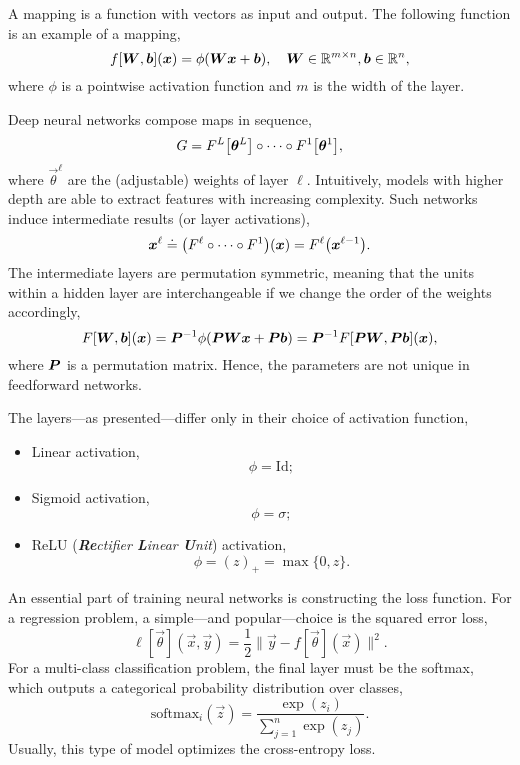 A mapping is a function with vectors as input and output. The following function is an example of a
mapping, \[
    f[\bm{W}, \bm{b}](\bm{x}) = \phi(\bm{W} \bm{x} + \bm{b}), \quad \bm{W} \in \mathbb{R}^{m \times n}, \bm{b} \in \mathbb{R}^n,
\]
where $\phi$ is a pointwise activation function and $m$ is the width of the layer.

Deep neural networks compose maps in sequence, \[
    G = F^L\lft[ \vec{\theta}^L \rgt] \circ \cdots \circ F^1 \lft[ \vec{\theta}^1 \rgt],
\]
where $\vec{\theta}^{\ell}$ are the (adjustable) weights of layer $\ell$. Intuitively, models with
higher depth are able to extract features with increasing complexity. Such networks induce
intermediate results (or layer activations), \[
    \vec{x}^{\ell} \doteq \lft( F^{\ell} \circ \cdots \circ F^{1} \rgt)(\vec{x}) = F^{\ell}\lft( \vec{x}^{\ell-1} \rgt).
\]
The intermediate layers are permutation symmetric, meaning that the units within a hidden layer are
interchangeable if we change the order of the weights accordingly, \[
    F[\bm{W}, \bm{b}](\bm{x}) = \bm{P}^{-1} \phi(\bm{P}\bm{W}\bm{x} + \bm{P}\bm{b}) = \bm{P}^{-1} F[\bm{P}\bm{W},\bm{P}\bm{b}](\bm{x}),
\]
where $\bm{P}$ is a permutation matrix. Hence, the parameters are not unique in feedforward networks.

The layers---as presented---differ only in their choice of activation function,
\begin{itemize}
    \item Linear activation, \[
              \phi = \mathrm{Id};
          \]
    \item Sigmoid activation, \[
              \phi = \sigma;
          \]
    \item ReLU (\textit{\textbf{Re}ctifier \textbf{L}inear \textbf{U}nit}) activation, \[
              \phi = (z)_+ = \max \{ 0, z \}.
          \]
\end{itemize}

An essential part of training neural networks is constructing the loss function. For a regression
problem, a simple---and popular---choice is the squared error loss, \[
    \ell[\vec{\theta}](\vec{x}, \vec{y}) = \frac{1}{2} \| \vec{y} - f[\vec{\theta}](\vec{x}) \|^2.
\]
For a multi-class classification problem, the final layer must be the softmax, which outputs a
categorical probability distribution over classes, \[
    \mathrm{softmax}_i(\vec{z}) = \frac{\exp(z_i)}{\sum_{j=1}^{n} \exp(z_j)}.
\]
Usually, this type of model optimizes the cross-entropy loss.

